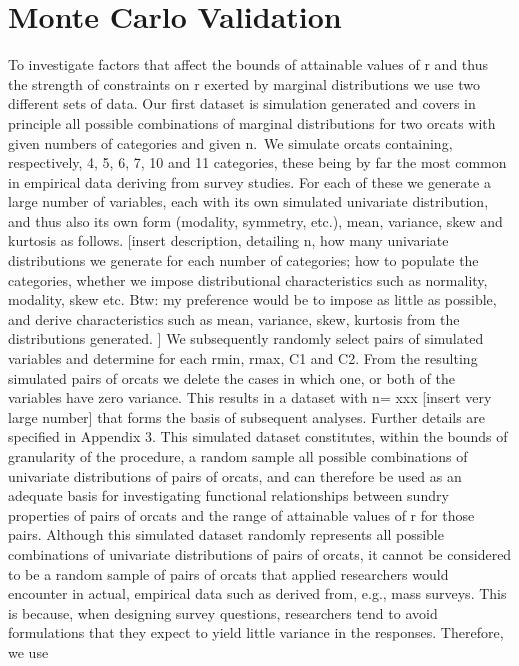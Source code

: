 \documentclass[
  12pt,
]{article}
\theoremstyle{plain}
\theoremstyle{definition}
\theoremstyle{remark}
\begin{document}
\section{Monte Carlo Validation}\label{sec-MCsim}

To investigate factors that affect the bounds of attainable values of r
and thus the strength of constraints on r exerted by marginal
distributions we use two different sets of data. Our first dataset is
simulation generated and covers in principle all possible combinations
of marginal distributions for two orcats with given numbers of
categories and given n.~We simulate orcats containing, respectively, 4,
5, 6, 7, 10 and 11 categories, these being by far the most common in
empirical data deriving from survey studies. For each of these we
generate a large number of variables, each with its own simulated
univariate distribution, and thus also its own form (modality, symmetry,
etc.), mean, variance, skew and kurtosis as follows. {[}insert
description, detailing n, how many univariate distributions we generate
for each number of categories; how to populate the categories, whether
we impose distributional characteristics such as normality, modality,
skew etc. Btw: my preference would be to impose as little as possible,
and derive characteristics such as mean, variance, skew, kurtosis from
the distributions generated. {]} We subsequently randomly select pairs
of simulated variables and determine for each rmin, rmax, C1 and C2.
From the resulting simulated pairs of orcats we delete the cases in
which one, or both of the variables have zero variance. This results in
a dataset with n= xxx {[}insert very large number{]} that forms the
basis of subsequent analyses. Further details are specified in Appendix
3. This simulated dataset constitutes, within the bounds of granularity
of the procedure, a random sample all possible combinations of
univariate distributions of pairs of orcats, and can therefore be used
as an adequate basis for investigating functional relationships between
sundry properties of pairs of orcats and the range of attainable values
of r for those pairs. Although this simulated dataset randomly
represents all possible combinations of univariate distributions of
pairs of orcats, it cannot be considered to be a random sample of pairs
of orcats that applied researchers would encounter in actual, empirical
data such as derived from, e.g., mass surveys. This is because, when
designing survey questions, researchers tend to avoid formulations that
they expect to yield little variance in the responses. Therefore, we use
\end{document}
